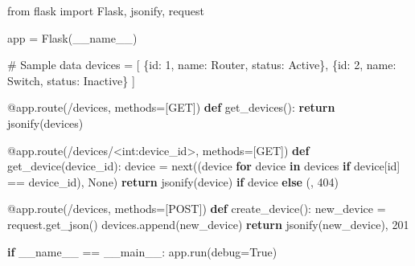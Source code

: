 \documentclass[
  letterpaper,
  DIV=11,
  numbers=noendperiod]{scrreprt}
\newenvironment{Shaded}{\begin{snugshade}}{\end{snugshade}}
\newcommand{\AttributeTok}[1]{\textcolor[rgb]{0.40,0.45,0.13}{#1}}
\newcommand{\BuiltInTok}[1]{\textcolor[rgb]{0.00,0.23,0.31}{#1}}
\newcommand{\CommentTok}[1]{\textcolor[rgb]{0.37,0.37,0.37}{#1}}
\newcommand{\ControlFlowTok}[1]{\textcolor[rgb]{0.00,0.23,0.31}{\textbf{#1}}}
\newcommand{\DecValTok}[1]{\textcolor[rgb]{0.68,0.00,0.00}{#1}}
\newcommand{\ImportTok}[1]{\textcolor[rgb]{0.00,0.46,0.62}{#1}}
\newcommand{\KeywordTok}[1]{\textcolor[rgb]{0.00,0.23,0.31}{\textbf{#1}}}
\newcommand{\NormalTok}[1]{\textcolor[rgb]{0.00,0.23,0.31}{#1}}
\newcommand{\OperatorTok}[1]{\textcolor[rgb]{0.37,0.37,0.37}{#1}}
\newcommand{\StringTok}[1]{\textcolor[rgb]{0.13,0.47,0.30}{#1}}
\newcommand{\VariableTok}[1]{\textcolor[rgb]{0.07,0.07,0.07}{#1}}
\begin{document}
\begin{Shaded}
\begin{Highlighting}[]
\ImportTok{from}\NormalTok{ flask }\ImportTok{import}\NormalTok{ Flask, jsonify, request}

\NormalTok{app }\OperatorTok{=}\NormalTok{ Flask(}\VariableTok{\_\_name\_\_}\NormalTok{)}

\CommentTok{\# Sample data}
\NormalTok{devices }\OperatorTok{=}\NormalTok{ [}
\NormalTok{    \{}\StringTok{\textquotesingle{}id\textquotesingle{}}\NormalTok{: }\DecValTok{1}\NormalTok{, }\StringTok{\textquotesingle{}name\textquotesingle{}}\NormalTok{: }\StringTok{\textquotesingle{}Router\textquotesingle{}}\NormalTok{, }\StringTok{\textquotesingle{}status\textquotesingle{}}\NormalTok{: }\StringTok{\textquotesingle{}Active\textquotesingle{}}\NormalTok{\},}
\NormalTok{    \{}\StringTok{\textquotesingle{}id\textquotesingle{}}\NormalTok{: }\DecValTok{2}\NormalTok{, }\StringTok{\textquotesingle{}name\textquotesingle{}}\NormalTok{: }\StringTok{\textquotesingle{}Switch\textquotesingle{}}\NormalTok{, }\StringTok{\textquotesingle{}status\textquotesingle{}}\NormalTok{: }\StringTok{\textquotesingle{}Inactive\textquotesingle{}}\NormalTok{\}}
\NormalTok{]}

\AttributeTok{@app.route}\NormalTok{(}\StringTok{\textquotesingle{}/devices\textquotesingle{}}\NormalTok{, methods}\OperatorTok{=}\NormalTok{[}\StringTok{\textquotesingle{}GET\textquotesingle{}}\NormalTok{])}
\KeywordTok{def}\NormalTok{ get\_devices():}
    \ControlFlowTok{return}\NormalTok{ jsonify(devices)}

\AttributeTok{@app.route}\NormalTok{(}\StringTok{\textquotesingle{}/devices/\textless{}int:device\_id\textgreater{}\textquotesingle{}}\NormalTok{, methods}\OperatorTok{=}\NormalTok{[}\StringTok{\textquotesingle{}GET\textquotesingle{}}\NormalTok{])}
\KeywordTok{def}\NormalTok{ get\_device(device\_id):}
\NormalTok{    device }\OperatorTok{=} \BuiltInTok{next}\NormalTok{((device }\ControlFlowTok{for}\NormalTok{ device }\KeywordTok{in}\NormalTok{ devices }\ControlFlowTok{if}\NormalTok{ device[}\StringTok{\textquotesingle{}id\textquotesingle{}}\NormalTok{] }\OperatorTok{==}\NormalTok{ device\_id), }\VariableTok{None}\NormalTok{)}
    \ControlFlowTok{return}\NormalTok{ jsonify(device) }\ControlFlowTok{if}\NormalTok{ device }\ControlFlowTok{else}\NormalTok{ (}\StringTok{\textquotesingle{}\textquotesingle{}}\NormalTok{, }\DecValTok{404}\NormalTok{)}

\AttributeTok{@app.route}\NormalTok{(}\StringTok{\textquotesingle{}/devices\textquotesingle{}}\NormalTok{, methods}\OperatorTok{=}\NormalTok{[}\StringTok{\textquotesingle{}POST\textquotesingle{}}\NormalTok{])}
\KeywordTok{def}\NormalTok{ create\_device():}
\NormalTok{    new\_device }\OperatorTok{=}\NormalTok{ request.get\_json()}
\NormalTok{    devices.append(new\_device)}
    \ControlFlowTok{return}\NormalTok{ jsonify(new\_device), }\DecValTok{201}

\ControlFlowTok{if} \VariableTok{\_\_name\_\_} \OperatorTok{==} \StringTok{\textquotesingle{}\_\_main\_\_\textquotesingle{}}\NormalTok{:}
\NormalTok{    app.run(debug}\OperatorTok{=}\VariableTok{True}\NormalTok{)}
\end{Highlighting}
\end{Shaded}
\end{document}
